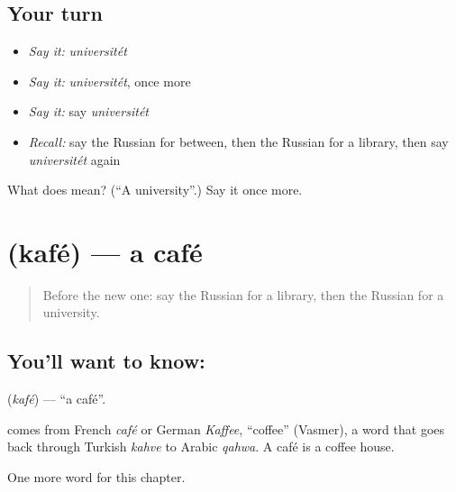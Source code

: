 \subsection*{Your turn}
\begin{itemize}
\raggedright
  \item \emph{Say it:} \emph{universitét}
  \item \emph{Say it:} \emph{universitét}, once more
  \item \emph{Say it:} say \emph{universitét}
  \item \emph{Recall:} say the Russian for between, then the Russian for a library, then say \emph{universitét} again
\end{itemize}

\begin{tcolorbox}[breakable,colback=teal!4,colframe=teal!35!black,title={Before you move on}]
What does  mean? (\textquotedblleft{}A university\textquotedblright{}.) Say it once more.
\end{tcolorbox}
\section[\texorpdfstring{\ru{кафе} (kafé)}{кафе (kafé)}]{ (kafé) — a café}

\label{lesson:RU-C242-kafe}



\begin{quote}
Before the new one: say the Russian for a library, then the Russian for a university.
\end{quote}

\subsection*{You'll want to know: }
\textbf{} (\emph{kafé}) — \textquotedblleft{}a café\textquotedblright{}.

\begin{cousinweb}
\textbf{} comes from French \emph{café} or German \emph{Kaffee}, \textquotedblleft{}coffee\textquotedblright{} (Vasmer), a word that goes back through Turkish \emph{kahve} to Arabic \emph{qahwa}. A café is a coffee house.
\end{cousinweb}

\begin{grammarlens}[title={What you've built}]
One more word for this chapter.
\end{grammarlens}

